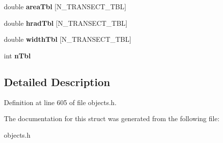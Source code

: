 \begin{DoxyCompactItemize}
\item 
\mbox{\label{struct_t_transect_a3b41b60cb7dd02cdfe65a977b7296352}} 
double {\bfseries area\+Tbl} \mbox{[}N\+\_\+\+T\+R\+A\+N\+S\+E\+C\+T\+\_\+\+T\+BL\mbox{]}
\item 
\mbox{\label{struct_t_transect_a9a3b82a00e6227bd34435aa86c33440d}} 
double {\bfseries hrad\+Tbl} \mbox{[}N\+\_\+\+T\+R\+A\+N\+S\+E\+C\+T\+\_\+\+T\+BL\mbox{]}
\item 
\mbox{\label{struct_t_transect_a0e02ae1a7f9e73c7a8584328ce2edeb6}} 
double {\bfseries width\+Tbl} \mbox{[}N\+\_\+\+T\+R\+A\+N\+S\+E\+C\+T\+\_\+\+T\+BL\mbox{]}
\item 
\mbox{\label{struct_t_transect_a430107c5ad502b4cd2b56a4a250252e4}} 
int {\bfseries n\+Tbl}
\end{DoxyCompactItemize}


\subsection{Detailed Description}


Definition at line 605 of file objects.\+h.



The documentation for this struct was generated from the following file\+:\begin{DoxyCompactItemize}
\item 
objects.\+h\end{DoxyCompactItemize}
